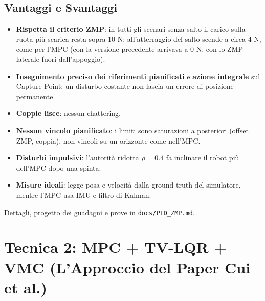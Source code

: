 \documentclass[11pt,a4paper]{article}
\begin{document}
\subsection{Vantaggi e Svantaggi}
\begin{itemize}
    \item[\textcolor{green}{\textbf{+}}] \textbf{Rispetta il criterio ZMP}: in tutti gli scenari senza salto il carico sulla ruota più scarica resta sopra 10 N; all'atterraggio del salto scende a circa 4 N, come per l'MPC (con la versione precedente arrivava a 0 N, con lo ZMP laterale fuori dall'appoggio).
    \item[\textcolor{green}{\textbf{+}}] \textbf{Inseguimento preciso dei riferimenti pianificati} e \textbf{azione integrale} sul Capture Point: un disturbo costante non lascia un errore di posizione permanente.
    \item[\textcolor{green}{\textbf{+}}] \textbf{Coppie lisce}: nessun chattering.
    \item[\textcolor{red}{\textbf{--}}] \textbf{Nessun vincolo pianificato}: i limiti sono saturazioni a posteriori (offset ZMP, coppia), non vincoli su un orizzonte come nell'MPC.
    \item[\textcolor{red}{\textbf{--}}] \textbf{Disturbi impulsivi}: l'autorità ridotta $\rho = 0.4$ fa inclinare il robot più dell'MPC dopo una spinta.
    \item[\textcolor{red}{\textbf{--}}] \textbf{Misure ideali}: legge posa e velocità dalla ground truth del simulatore, mentre l'MPC usa IMU e filtro di Kalman.
\end{itemize}
Dettagli, progetto dei guadagni e prove in \texttt{docs/PID\_ZMP.md}.

\section{Tecnica 2: MPC + TV-LQR + VMC (L'Approccio del Paper Cui et al.)}
\end{document}
